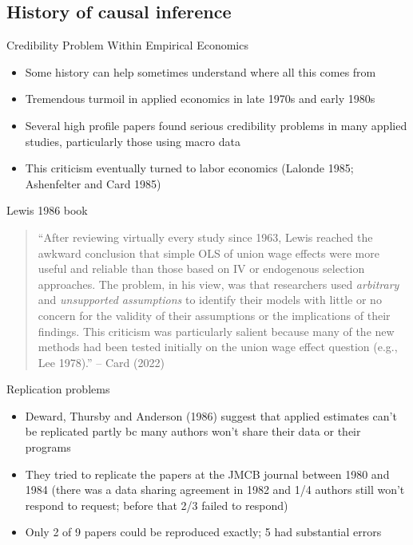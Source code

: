 \documentclass{beamer}
\begin{document}
\subsection{History of causal inference}



\begin{frame}{Credibility Problem Within Empirical Economics}

  \begin{itemize}
  \item Some history can help sometimes understand where all this comes from
  \item Tremendous turmoil in applied economics in late 1970s and early 1980s
  \item Several high profile papers found serious credibility problems in many applied studies, particularly those using macro data
  \item This criticism eventually turned to labor economics (Lalonde 1985; Ashenfelter and Card 1985)
  \end{itemize}

\end{frame}



\begin{frame}{Lewis 1986 book}

\begin{quote}
``After reviewing virtually every study since 1963, Lewis reached the awkward conclusion that simple OLS of union wage effects were more useful and reliable than those based on IV or endogenous selection approaches. The problem, in his view, was that researchers used \emph{arbitrary} and \emph{unsupported assumptions} to identify their models with little or no concern for the validity of their assumptions or the implications of their findings. This criticism was particularly salient because many of the new methods had been tested initially on the union wage effect question (e.g., Lee 1978).'' -- Card (2022)
\end{quote}

\end{frame}

\begin{frame}{Replication problems}

\begin{itemize}
\item Deward, Thursby and Anderson (1986) suggest that applied estimates can't be replicated partly bc many authors won't share their data or their programs
\item They tried to replicate the papers at the JMCB journal between 1980 and 1984 (there was a data sharing agreement in 1982 and 1/4 authors still won't respond to request; before that 2/3 failed to respond)
\item Only 2 of 9 papers could be reproduced exactly; 5 had substantial errors
\end{itemize}

\end{frame}
\end{document}
